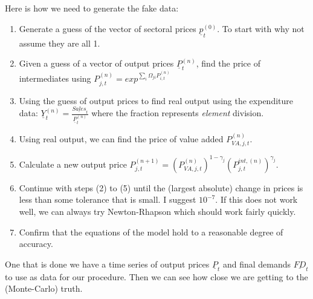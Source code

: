 \documentclass[12pt,english]{article}
\begin{document}
Here is how we need to generate the fake data:

\begin{enumerate}
	\item Generate a guess of the vector of sectoral prices $\underline{p}_{t}^{(0)}$. To start with why not assume they are all 1.
	\item Given a guess of a vector of output prices $\underline{P}_t^{(n)}$, find the price of intermediates using $P_{j,t}^{(n)} = exp^{\sum_i \Omega_{ji}P_{i,t}^{(n)}}$
	\item Using the guess of output prices to find real output using the expenditure data: $\underline{Y}_t^{(n)} = \frac{\underline{Sales}_t}{\underline{P}_t^{(n)}}$ where the fraction represents \emph{element} division.
	\item Using real output, we can find the price of value added $P_{VA,j,t}^{(n)}$.
	\item Calculate a new output price $P_{j,t}^{(n+1)} = (P_{VA,j,t}^{(n)})^{1-\gamma_j}(P_{j,t}^{int,(n)})^{\gamma_j}$.
	\item Continue with steps (2) to (5) until the (largest absolute) change in prices is less than some tolerance that is small. I suggest $10^{-7}$. If this does not work well, we can always try Newton-Rhapson which should work fairly quickly. 
	\item Confirm that the equations of the model hold to a reasonable degree of accuracy.
\end{enumerate}

One that is done we have a time series of output prices $\underline{P}_t$ and final demands $\underline{FD}_{t}$ to use as data for our procedure. Then we can see how close we are getting to the (Monte-Carlo) truth.
\end{document}
